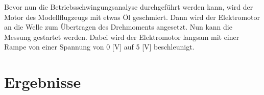     \noindent
    Bevor nun die Betriebsschwingungsanalyse durchgeführt werden kann, wird der
    Motor des Modellflugzeugs mit etwas Öl geschmiert. Dann wird der Elektromotor
    an die Welle zum Übertragen des Drehmoments angesetzt. Nun kann die Messung
    gestartet werden. Dabei wird der Elektromotor langsam mit einer Rampe von einer
    Spannung von 0 [V] auf 5 [V] beschleunigt. 


\section{Ergebnisse}


